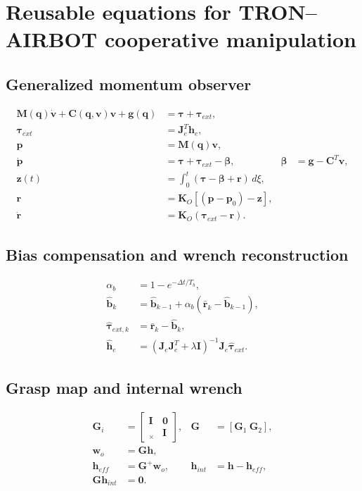 \documentclass[11pt]{article}
\newcommand{\vect}[1]{\bm{#1}}
\newcommand{\skewm}[1]{[#1]_{\times}}
\newcommand{\pinv}{^{+}}
\begin{document}
\section*{Reusable equations for TRON--AIRBOT cooperative manipulation}

\subsection*{Generalized momentum observer}
\begin{align}
\vect M(\vect q)\dot{\vect v}
+\vect C(\vect q,\vect v)\vect v+\vect g(\vect q)
&=\vect\tau+\vect\tau_{ext}, \tag{OBS-01}\\
\vect\tau_{ext}&=\vect J_e^T\vect h_e, \tag{OBS-02}\\
\vect p&=\vect M(\vect q)\vect v, \tag{OBS-03}\\
\dot{\vect p}&=\vect\tau+\vect\tau_{ext}-\vect\beta,
&\vect\beta&=\vect g-\vect C^T\vect v, \tag{OBS-04}\\
\vect z(t)&=\int_0^t(\vect\tau-\vect\beta+\vect r)\,d\xi, \tag{OBS-05}\\
\vect r&=\vect K_O[(\vect p-\vect p_0)-\vect z], \tag{OBS-06}\\
\dot{\vect r}&=\vect K_O(\vect\tau_{ext}-\vect r). \tag{OBS-07}
\end{align}

\subsection*{Bias compensation and wrench reconstruction}
\begin{align}
\alpha_b&=1-e^{-\Delta t/T_b}, \tag{BIAS-03}\\
\hat{\vect b}_k&=\hat{\vect b}_{k-1}
+\alpha_b(\bar{\vect r}_k-\hat{\vect b}_{k-1}), \tag{BIAS-03b}\\
\hat{\vect\tau}_{ext,k}&=\bar{\vect r}_k-\hat{\vect b}_k, \tag{BIAS-04}\\
\hat{\vect h}_e&=
(\vect J_e\vect J_e^T+\lambda\vect I)^{-1}
\vect J_e\hat{\vect\tau}_{ext}. \tag{WRE-03}
\end{align}

\subsection*{Grasp map and internal wrench}
\begin{align}
\vect G_i&=
\begin{bmatrix}\vect I&\vect0\\\skewm{\vect r_i}&\vect I\end{bmatrix},
&\vect G&=[\vect G_1\ \vect G_2], \tag{GRASP-02}\\
\vect w_o&=\vect G\vect h, \tag{GRASP-03}\\
\vect h_{eff}&=\vect G\pinv\vect w_o,
&\vect h_{int}&=\vect h-\vect h_{eff}, \tag{INT-01}\\
\vect G\vect h_{int}&=\vect0. \tag{INT-02}
\end{align}
\end{document}
